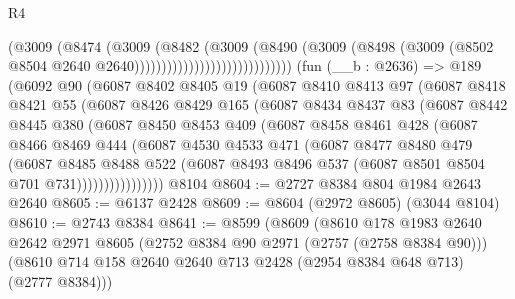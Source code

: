\begin{lexlean}{R4}
\begin{coremodule}
                                          (@3009
                                            (@8474
                                              (@3009
                                                (@8482
                                                  (@3009
                                                    (@8490
                                                      (@3009
                                                        (@8498
                                                          (@3009
                                                            (@8502
                                                              @8504
                                                              @2640
                                                              @2640)))))))))))))))))))))))))))))
    (fun (__b : @2636) =>
    @189
      (@6092
        @90
        (@6087
          @8402
          @8405
          @19
          (@6087
            @8410
            @8413
            @97
            (@6087
              @8418
              @8421
              @55
              (@6087
                @8426
                @8429
                @165
                (@6087
                  @8434
                  @8437
                  @83
                  (@6087
                    @8442
                    @8445
                    @380
                    (@6087
                      @8450
                      @8453
                      @409
                      (@6087
                        @8458
                        @8461
                        @428
                        (@6087
                          @8466
                          @8469
                          @444
                          (@6087
                            @4530
                            @4533
                            @471
                            (@6087
                              @8477
                              @8480
                              @479
                              (@6087
                                @8485
                                @8488
                                @522
                                (@6087 @8493 @8496 @537 (@6087 @8501 @8504 @701 @731))))))))))))))))
    @8104
@8604 := @2727 @8384 @804 @1984 @2643 @2640
@8605 := @6137 @2428
@8609 := @8604 (@2972 @8605) (@3044 @8104)
@8610 := @2743 @8384
@8641 := @8599
    (@8609
      (@8610
        @178
        @1983
        @2640
        @2642
        @2971
        @8605
        (@2752 @8384 @90 @2971 (@2757 (@2758 @8384 @90)))
        (@8610 @714 @158 @2640 @2640 @713 @2428 (@2954 @8384 @648 @713) (@2777 @8384)))

\end{coremodule}
\end{lexlean}
